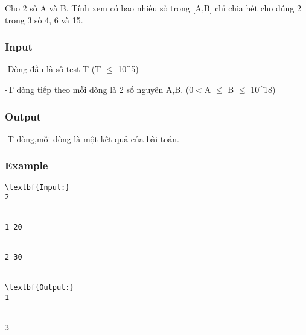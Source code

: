



   Cho 2 số A và B. Tính xem có bao nhiêu số trong [A,B] chỉ chia hết cho đúng 2 trong 3 số 4, 6 và 15.  

\subsubsection{   Input  }

   -Dòng đầu là số test T (T $\le$ 10^5)  

   -T dòng tiếp theo mỗi dòng là 2 số nguyên A,B. (0$<$A $\le$ B $\le$ 10^18)  

\subsubsection{   Output  }

   -T dòng,mỗi dòng là một kết quả của bài toán.  



\subsubsection{   Example  }
\begin{verbatim}
\textbf{Input:}
2


1 20


2 30


\textbf{Output:}
1


3 


\end{verbatim}
